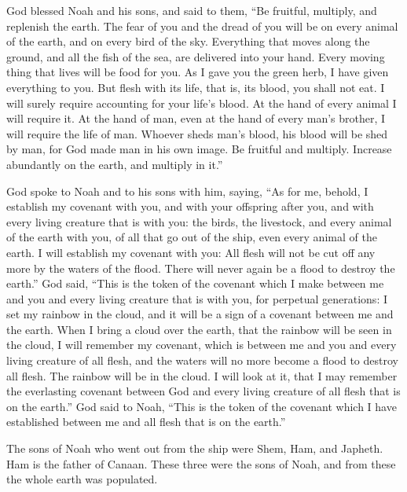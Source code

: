 \mychapter{}
\myverse*{}God blessed Noah and his sons, and said to them, “Be fruitful, multiply, and replenish the earth. \myverse{}The fear of you and the dread of you will be on every animal of the earth, and on every bird of the sky. Everything that moves along the ground, and all the fish of the sea, are delivered into your hand. \myverse{}Every moving thing that lives will be food for you. As I gave you the green herb, I have given everything to you. \myverse{}But flesh with its life, that is, its blood, you shall not eat. \myverse{}I will surely require accounting for your life’s blood. At the hand of every animal I will require it. At the hand of man, even at the hand of every man’s brother, I will require the life of man. \myverse{}Whoever sheds man’s blood, his blood will be shed by man, for God made man in his own image. \myverse{}Be fruitful and multiply. Increase abundantly on the earth, and multiply in it.”

\myverse{}God spoke to Noah and to his sons with him, saying, \myverse{}“As for me, behold, I establish my covenant with you, and with your offspring after you, \myverse{} and with every living creature that is with you: the birds, the livestock, and every animal of the earth with you, of all that go out of the ship, even every animal of the earth. \myverse{}I will establish my covenant with you: All flesh will not be cut off any more by the waters of the flood. There will never again be a flood to destroy the earth.” \myverse{}God said, “This is the token of the covenant which I make between me and you and every living creature that is with you, for perpetual generations: \myverse{}I set my rainbow in the cloud, and it will be a sign of a covenant between me and the earth. \myverse{}When I bring a cloud over the earth, that the rainbow will be seen in the cloud, \myverse{}I will remember my covenant, which is between me and you and every living creature of all flesh, and the waters will no more become a flood to destroy all flesh. \myverse{}The rainbow will be in the cloud. I will look at it, that I may remember the everlasting covenant between God and every living creature of all flesh that is on the earth.” \myverse{}God said to Noah, “This is the token of the covenant which I have established between me and all flesh that is on the earth.”

\myverse{}The sons of Noah who went out from the ship were Shem, Ham, and Japheth. Ham is the father of Canaan. \myverse{}These three were the sons of Noah, and from these the whole earth was populated.

